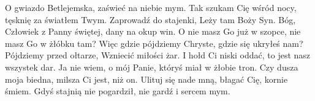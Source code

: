 \beginverse
O gwiazdo Betlejemska,
zaświeć na niebie mym.
Tak szukam Cię wśród nocy,
tęsknię za światłem Twym.
Zaprowadź do stajenki,
Leży tam Boży Syn.
Bóg, Człowiek z Panny świętej,
dany na okup win.
\endverse
\beginverse
O nie masz Go już w szopce,
nie masz Go w żłóbku tam?
Więc gdzie pójdziemy Chryste,
gdzie się ukryłeś nam?
Pójdziemy przed ołtarze,
Wzniecić miłości żar.
I hołd Ci niski oddać,
to jest nasz wszystek dar.
\endverse
\beginverse
Ja nie wiem, o mój Panie,
któryś miał w żłobie tron.
Czy dusza moja biedna,
milsza Ci jest, niż on.
Ulituj się nade mną, błagać Cię,
kornie śmiem.
Gdyś stajnią nie pogardził,
nie gardź i sercem mym.
\endverse
\endsong